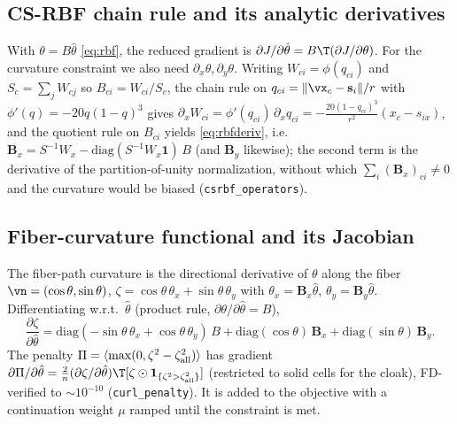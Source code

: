 \documentclass[11pt]{article}
\begin{document}
\subsection{CS-RBF chain rule and its analytic derivatives}
With $\theta=B\hat\theta$ \eqref{eq:rbf}, the reduced gradient is
$\partial J/\partial\hat\theta=B\T(\partial J/\partial\theta)$. For the curvature
constraint we also need $\partial_x\theta,\partial_y\theta$. Writing
$W_{ci}=\phi(q_{ci})$ and $S_c=\sum_jW_{cj}$ so $B_{ci}=W_{ci}/S_c$, the chain rule
on $q_{ci}=\lVert\vx_c-\mathbf s_i\rVert/r$ with $\phi'(q)=-20q(1-q)^3$ gives
$\partial_x W_{ci}=\phi'(q_{ci})\,\partial_x q_{ci}
=-\tfrac{20(1-q_{ci})^3}{r^2}(x_c-s_{ix})$, and the quotient rule on $B_{ci}$
yields \eqref{eq:rbfderiv}, i.e.\ $\mathbf B_x=S^{-1}W_x-\mathrm{diag}(S^{-1}W_x
\mathbf 1)\,B$ (and $\mathbf B_y$ likewise); the second term is the derivative of
the partition-of-unity normalization, without which $\sum_i(\mathbf B_x)_{ci}\neq0$
and the curvature would be biased (\texttt{csrbf\_operators}).

\subsection{Fiber-curvature functional and its Jacobian}
The fiber-path curvature is the directional derivative of $\theta$ along the fiber
$\vn=(\cos\theta,\sin\theta)$,
$\zeta=\cos\theta\,\theta_x+\sin\theta\,\theta_y$ with $\theta_x=\mathbf
B_x\hat\theta$, $\theta_y=\mathbf B_y\hat\theta$. Differentiating w.r.t.\
$\hat\theta$ (product rule, $\partial\theta/\partial\hat\theta=B$),
\begin{equation}
  \frac{\partial\zeta}{\partial\hat\theta}
  =\mathrm{diag}(-\sin\theta\,\theta_x+\cos\theta\,\theta_y)\,B
  +\mathrm{diag}(\cos\theta)\,\mathbf B_x+\mathrm{diag}(\sin\theta)\,\mathbf B_y .
\end{equation}
The penalty $\Pi=\langle\max(0,\zeta^2-\zeta_{\rm all}^2)\rangle$ has gradient
$\partial\Pi/\partial\hat\theta=\tfrac{2}{n}(\partial\zeta/\partial\hat\theta)\T
[\zeta\odot\mathbf 1_{\{\zeta^2>\zeta_{\rm all}^2\}}]$ (restricted to solid cells
for the cloak), FD-verified to $\sim\!10^{-10}$ (\texttt{curl\_penalty}). It is
added to the objective with a continuation weight $\mu$ ramped until the
constraint is met.
\end{document}
